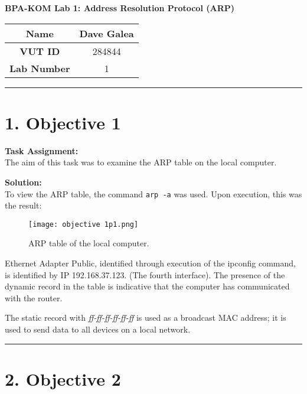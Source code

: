 \documentclass[a4paper,12pt]{article}
\begin{document}
\begin{center}
    {\Large \textbf{BPA-KOM Lab 1: Address Resolution Protocol (ARP)}}\\[1em]
\end{center}

\begin{center}
\begin{tabular}{|c|c|}
\hline
\textbf{Name} & Dave Galea \\ \hline
\textbf{VUT ID} & 284844 \\ \hline
\textbf{Lab Number} & 1 \\ \hline
\end{tabular}
\end{center}

\vspace{0.5cm}
\hrule
\vspace{0.5cm}


\section*{1. Objective 1}

\textbf{Task Assignment:} \\
The aim of this task was to examine the ARP table on the local computer.

\vspace{0.5em}
\textbf{Solution:} \\
To view the ARP table, the command \texttt{arp -a} was used. Upon execution, this was the result:
\begin{figure}[H]
\centering
\texttt{[image: objective 1p1.png]}
\caption{ARP table of the local computer.}
\end{figure}
Ethernet Adapter Public, identified through execution of the ipconfig command, is identified by IP 192.168.37.123. (The fourth interface). 
The presence of the dynamic record in the table is indicative that the computer has communicated with the router.

The static record with \textit{ff-ff-ff-ff-ff-ff} is used as a broadcast MAC address; it is used to send data to all devices on a local network.
\vspace{1em}
\hrule
\vspace{0.5em}

\section*{2. Objective 2}
\end{document}

